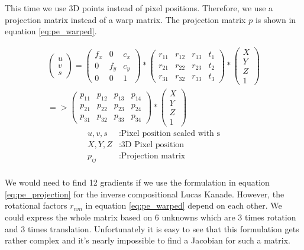 \documentclass[11pt,a4paper,titlepage,oneside]{report}
\begin{document}
This time we use 3D points instead of pixel positions. Therefore, we use a projection matrix instead of a warp matrix. The projection matrix $p$ is shown in equation \ref{eq:pe_warped}. 

\begin{equation}\label{eq:pe_warped}
  \begin{split}
  \begin{pmatrix}
    u \\
    v \\
    s
  \end{pmatrix}=
  \begin{pmatrix}
    f_x & 0 & c_x \\
    0 & f_y & c_y \\
    0 & 0 & 1
  \end{pmatrix}*
  \begin{pmatrix}
    r_{11} & r_{12} & r_{13} & t_{1} \\
    r_{21} & r_{22} & r_{23} & t_{2} \\
    r_{31} & r_{32} & r_{33} & t_{3}
  \end{pmatrix}*
  \begin{pmatrix}
    X\\
    Y\\
    Z\\
    1
  \end{pmatrix}\\
  =>\begin{pmatrix}
    p_{11} & p_{12} & p_{13} & p_{14} \\
    p_{21} & p_{22} & p_{23} & p_{24} \\
    p_{31} & p_{32} & p_{33} & p_{34}
  \end{pmatrix}*
  \begin{pmatrix}
    X\\
    Y\\
    Z\\
    1
  \end{pmatrix}
\end{split}
\end{equation}
\begin{align*}
  u,v,s      &:  \text{Pixel position scaled with s}\\
  X,Y,Z      &:  \text{3D Pixel position}\\
  p_{ij}    &:  \text{Projection matrix}\\
\end{align*}

We would need to find 12 gradients if we use the formulation in equation \ref{eq:pe_projection} for the inverse compositional Lucas Kanade. However, the rotational factors $r_{nm}$ in equation \ref{eq:pe_warped} depend on each other. We could express the whole matrix based on 6 unknowns which are 3 times rotation and 3 times translation. Unfortunately it is easy to see that this formulation gets rather complex and it's nearly impossible to find a Jacobian for such a matrix.\\
\end{document}
